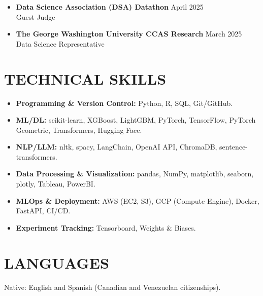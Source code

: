\documentclass[a4paper,9pt]{extarticle}
\begin{document}
\begin{itemize}[leftmargin=0.5cm, label={}]
    \item \textbf{Data Science Association (DSA) Datathon} \hfill April 2025 \\
    Guest Judge
\end{itemize}

\begin{itemize}[leftmargin=0.5cm, label={}]
    \item \textbf{The George Washington University CCAS Research} \hfill March 2025 \\
    Data Science Representative 
\end{itemize}

\section*{TECHNICAL SKILLS}

\begin{itemize}[leftmargin=0.5cm, label={}]
    \item \textbf{Programming \& Version Control:} Python, R, SQL, Git/GitHub. \\
    
    \item \textbf{ML/DL:} scikit-learn, XGBoost, LightGBM, PyTorch, TensorFlow, PyTorch Geometric, Transformers, Hugging Face. \\
    
    \item \textbf{NLP/LLM:} nltk, spacy, LangChain, OpenAI API, ChromaDB, sentence-transformers. \\
    
    \item \textbf{Data Processing \& Visualization:} pandas, NumPy, matplotlib, seaborn, plotly, Tableau, PowerBI. \\ 
    
    \item \textbf{MLOps \& Deployment:} AWS (EC2, S3), GCP (Compute Engine), Docker, FastAPI, CI/CD. \\ 
    
    \item \textbf{Experiment Tracking:} Tensorboard, Weights \& Biases.
\end{itemize}

\section*{LANGUAGES}

\hspace{0.37cm} Native: English and Spanish (Canadian and Venezuelan citizenships).

\end{document}

